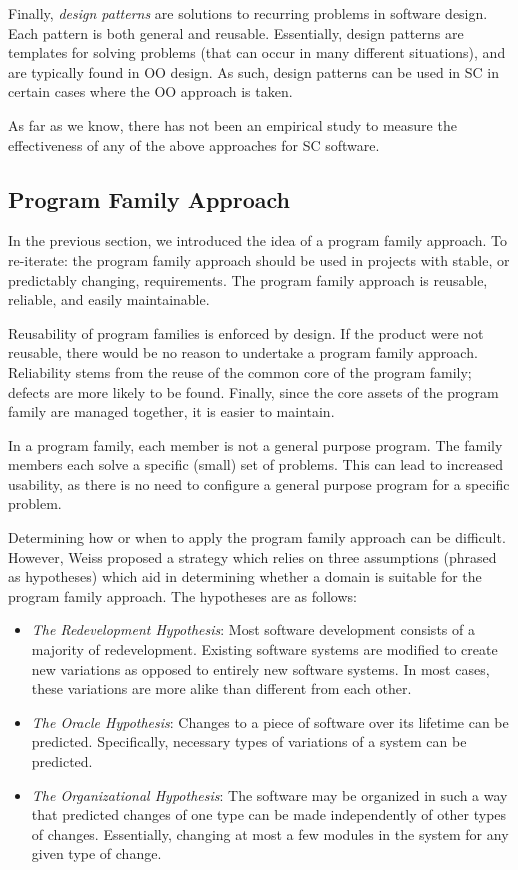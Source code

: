 \documentclass[10pt, preprint]{sigplanconf}
\begin{document}
Finally, \textit{design patterns} are solutions to recurring problems in
software design. Each pattern is both general and reusable. Essentially, design
patterns are templates for solving problems (that can occur in many different
situations), and are typically found in OO design. As such, design patterns can
be used in SC in certain cases where the OO approach is taken.

As far as we know, there has not been an empirical study to measure the
effectiveness of any of the above approaches for SC software.

\subsection{Program Family Approach} \label{subsec:program}

In the previous section, we introduced the idea of a program family approach. To
re-iterate: the program family approach should be used in projects with stable,
or predictably changing, requirements. The program family approach is reusable,
reliable, and easily maintainable.

Reusability of program families is enforced by design. If the product were not
reusable, there would be no reason to undertake a program family
approach. Reliability stems from the reuse of the common core of the program
family; defects are more likely to be found. Finally, since the core assets of
the program family are managed together, it is easier to maintain.

In a program family, each member is not a general purpose program. The family
members each solve a specific (small) set of problems. This can lead to
increased usability, as there is no need to configure a general purpose program
for a specific problem.

Determining how or when to apply the program family approach can be
difficult. However, Weiss \cite{Weiss} proposed a strategy which relies on three
assumptions (phrased as hypotheses) which aid in determining whether a domain is
suitable for the program family approach. The hypotheses are as follows:

\begin{itemize}
\item \textit{The Redevelopment Hypothesis}: Most software development consists
  of a majority of redevelopment. Existing software systems are modified to
  create new variations as opposed to entirely new software systems. In most
  cases, these variations are more alike than different from each other.
\item \textit{The Oracle Hypothesis}: Changes to a piece of software over its
  lifetime can be predicted. Specifically, necessary types of variations of a
  system can be predicted.
\item \textit{The Organizational Hypothesis}: The software may be organized in
  such a way that predicted changes of one type can be made independently of
  other types of changes. Essentially, changing at most a few modules in the
  system for any given type of change.
\end{itemize}
\end{document}
